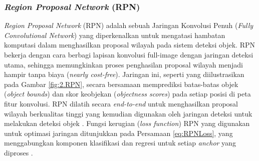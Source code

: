 

\subsubsection{\textit{Region Proposal Network} (RPN)} \label{II.TeoriRPN}
\textit{Region Proposal Network} (RPN) adalah sebuah Jaringan Konvolusi Penuh (\textit{Fully Convolutional Network}) yang diperkenalkan untuk mengatasi hambatan komputasi dalam menghasilkan proposal wilayah pada sistem deteksi objek. RPN bekerja dengan cara berbagi lapisan konvolusi full-image dengan jaringan deteksi utama, sehingga memungkinkan proses penghasilan proposal wilayah menjadi hampir tanpa biaya (\textit{nearly cost-free}). Jaringan ini, seperti yang diilustrasikan pada Gambar \ref{fig:2.RPN}, secara bersamaan memprediksi batas-batas objek (\textit{object bounds}) dan skor keobjekan (\textit{objectness scores}) pada setiap posisi di peta fitur konvolusi. RPN dilatih secara \textit{end-to-end} untuk menghasilkan proposal wilayah berkualitas tinggi yang kemudian digunakan oleh jaringan deteksi untuk melakukan deteksi objek \cite{RPN}. Fungsi kerugian (\textit{loss function}) RPN yang digunakan untuk optimasi jaringan ditunjukkan pada Persamaan \ref{eq:RPNLoss}, yang menggabungkan komponen klasifikasi dan regresi untuk setiap \textit{anchor} yang diproses \cite{RPN}. \par

